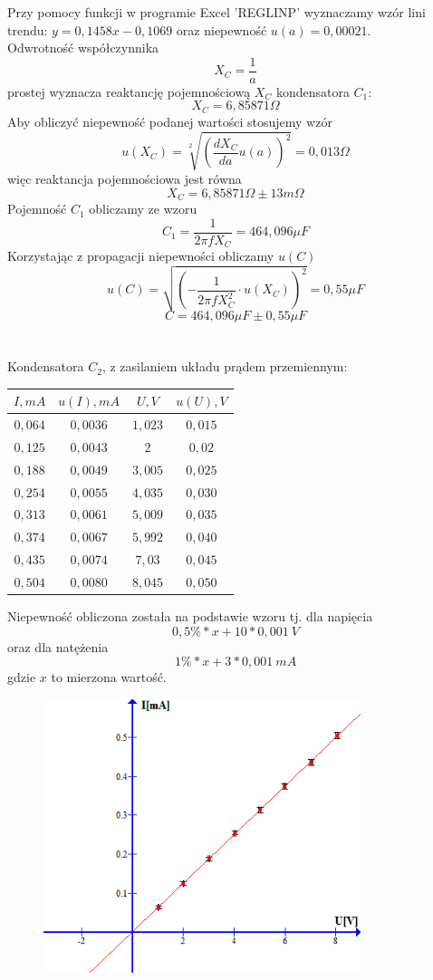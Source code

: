 \documentclass{article}
\begin{document}
Przy pomocy funkcji w programie Excel 'REGLINP' wyznaczamy wzór lini trendu: $y = 0,1458x - 0,1069$ oraz niepewność $u(a) = 0,00021$.\\
Odwrotność współczynnika 
$$X_C = \frac{1}{a}$$
prostej wyznacza reaktancję pojemnościową $X_C$ kondensatora $C_1$:
$$X_C = 6,85871 \Omega$$ 
Aby obliczyć niepewność podanej wartości stosujemy wzór
$$u(X_C) = \sqrt[2]{(\frac{dX_C}{da}u(a))^2} = 0,013 \Omega$$
więc reaktancja pojemnościowa jest równa
$$X_C = 6,85871 \Omega \pm 13 m \Omega$$
Pojemność $C_1$ obliczamy ze wzoru
$$C_1 = \frac{1}{2\pi fX_C} = 464,096 \mu F$$
Korzystając z propagacji niepewności obliczamy $u(C)$
$$u(C) = \sqrt{(-\frac{1}{2\pi f X_C^2} \cdot u(X_C))^2} = 0,55 \mu F$$
$$C = 464,096 \mu F \pm 0,55 \mu F$$
\\\\
Kondensatora $C_2$, z zasilaniem układu prądem przemiennym:
\begin{center}
    \begin{tabular}{|c|c|c|c|}
    \hline
$I,mA$ & $u(I), mA$ & $U,V$ & $u(U), V$\\ \hline
$0,064$ & $0,0036$ & $1,023$ & $0,015$\\ \hline
$0,125$ & $0,0043$ & $2$ & $0,02$\\ \hline
$0,188$ & $0,0049$ & $3,005$ & $0,025$\\ \hline
$0,254$ & $0,0055$ & $4,035$ & $0,030$\\ \hline
$0,313$ & $0,0061$ & $5,009$ & $0,035$\\ \hline
$0,374$ & $0,0067$ & $5,992$ & $0,040$\\ \hline
$0,435$ & $0,0074$ & $7,03$ & $0,045$\\ \hline
$0,504$ & $0,0080$ & $8,045$ & $0,050$\\ \hline
    \end{tabular}
\end{center}
Niepewność obliczona została na podstawie wzoru tj. dla napięcia
$$0,5\% * x + 10 * 0,001\ V $$
oraz dla natężenia
$$1\% * x + 3 * 0,001\ mA$$
gdzie $x$ to mierzona wartość.
\begin{figure}[ht]
\centering
\includegraphics[height=8cm]{wykres_5.png}
\end{figure}\\
\end{document}
